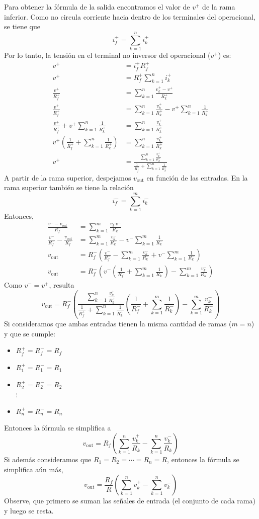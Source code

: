 Para obtener la fórmula de la salida encontramos el valor de \(v^+\) de la rama inferior. Como no circula corriente hacia dentro de los terminales del operacional, se tiene que \[i_f^+=\sum_{k=1}^n i_k^+\]
Por lo tanto, la tensión en el terminal no inversor del operacional (\(v^+\)) es:
\begin{align*}
  v^+ &= i_f^+ R_f^+ \\ 
  v^+ &= R_f^+ \sum_{k=1}^n i_k^+\\ 
  \frac{v^+}{R_f^+} &= \sum_{k=1}^n \frac{v_k^+-v^+}{R_k^+} \\ 
  \frac{v^+}{R_f^+} &= \sum_{k=1}^n \frac{v_k^+}{R_k^+} - v^+\sum_{k=1}^n \frac{1}{R_k^+} \\
  \frac{v^+}{R_f^+} + v^+\sum_{k=1}^n \frac{1}{R_k^+} &=\sum_{k=1}^n \frac{v_k^+}{R_k^+} \\
  v^+\left(\frac{1}{R_f^+}+\sum_{k=1}^n \frac{1}{R_k^+}\right) &= \sum_{k=1}^n \frac{v_k^+}{R_k^+} \\
  v^+ &= \frac{\sum_{k=1}^n \frac{v_k^+}{R_k^+}}{\frac{1}{R_f^+}+\sum_{k=1}^n \frac{1}{R_k^+}}
\end{align*}
A partir de la rama superior, despejamos \(v_\text{out}\) en función de las entradas. En la rama superior también se tiene la relación \[i_f^-=\sum_{k=1}^m i_k^-\] Entonces,
\begin{align*}
  \frac{v^- - v_\text{out}}{R_f^-} &= \sum_{k=1}^m \frac{v_k^-v^-}{R_k^-} \\ 
  \frac{v^-}{R_f^-} - \frac{v_\text{out}}{R_f^-} &= \sum_{k=1}^m \frac{v_k^-}{R_k^-} - v^-\sum_{k=1}^m \frac{1}{R_k^-} \\ 
  v_\text{out} &= R_f^-\left(\frac{v^-}{R_f^-} - \sum_{k=1}^m \frac{v_k^-}{R_k^-} + v^-\sum_{k=1}^m \frac{1}{R_k^-}\right) \\ 
  v_\text{out} &= R_f^-\left(v^-\left(\frac{1}{R_f^-}+\sum_{k=1}^m \frac{1}{R_k^-}\right) - \sum_{k=1}^m \frac{v_k^-}{R_k^-}\right) 
\end{align*}
Como \(v^-=v^+\), resulta
\[
  v_\text{out} = R_f^-\left(\frac{\sum_{k=1}^n \frac{v_k^+}{R_k^+}}{\frac{1}{R_f^+}+\sum_{k=1}^n \frac{1}{R_k^+}} \left(\frac{1}{R_f^-}+\sum_{k=1}^m \frac{1}{R_k^-}\right) - \sum_{k=1}^m \frac{v_k^-}{R_k^-}\right) 
\]
Si consideramos que ambas entradas tienen la misma cantidad de ramas (\(m=n\)) y que se cumple:
\begin{itemize}
  \item \(R_f^+=R_f^-=R_f\) 
  \item \(R_1^+=R_1^-=R_1\) 
  \item \(R_2^+=R_2^-=R_2\) \\ \(\vdots\)
  \item \(R_n^+=R_n^-=R_n\) 
\end{itemize}
Entonces la fórmula se simplifica a 
\[
  v_\text{out}= R_f\left( \sum_{k=1}^n \frac{v_k^+}{R_k} - \sum_{k=1}^n \frac{v_k^-}{R_k} \right)
\]
Si además consideramos que \(R_1=R_2=\cdots=R_n=R\), entonces la fórmula se simplifica aún más,
\[
  v_\text{out} = \frac{R_f}{R} \left( \sum_{k=1}^n v_k^+ - \sum_{k=1}^n v_k^- \right)
\]
Observe, que primero se suman las señales de entrada (el conjunto de cada rama) y luego se resta.
